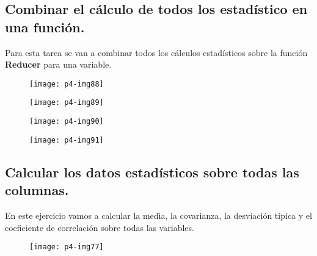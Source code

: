 \documentclass[10pt]{article}
\begin{document}
\subsection{Combinar el cálculo de todos los estadístico en una función.}
Para esta tarea se van a combinar todos los cálculos estadísticos sobre la función \textbf{Reducer} para una variable. \\

\begin{figure}[H]
	\begin{center}
 		\texttt{[image: p4-img88]}
	\end{center} 
\end{figure}

\begin{figure}[H]
	\begin{center}
 		\texttt{[image: p4-img89]}
	\end{center} 
\end{figure}

\begin{figure}[H]
	\begin{center}
 		\texttt{[image: p4-img90]}
	\end{center} 
\end{figure}

\begin{figure}[H]
	\begin{center}
 		\texttt{[image: p4-img91]}
	\end{center} 
\end{figure}





\subsection{Calcular los datos estadísticos sobre todas las columnas.}
En este ejercicio vamos a calcular la media, la covarianza, la desviación típica y el coeficiente de correlación sobre todas las variables.

\begin{figure}[H]
	\begin{center}
 		\texttt{[image: p4-img77]}
	\end{center} 
\end{figure}
\end{document}
